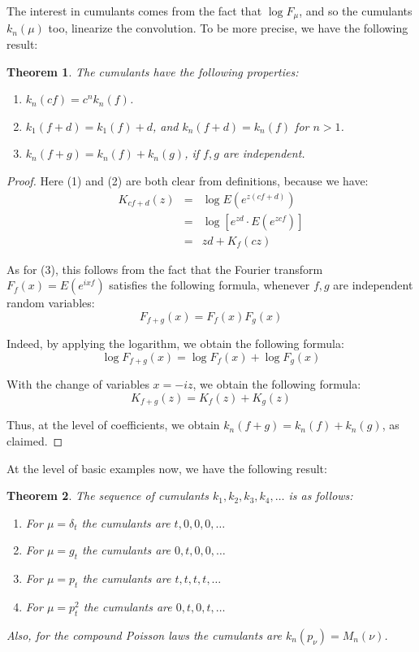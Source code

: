 \documentclass[12pt]{amsbook}
\newtheorem{theorem}{Theorem}[chapter]
\begin{document}
The interest in cumulants comes from the fact that $\log F_\mu$, and so the cumulants $k_n(\mu)$ too, linearize the convolution. To be more precise, we have the following result:


\begin{theorem}
The cumulants have the following properties:
\begin{enumerate}
\item $k_n(cf)=c^nk_n(f)$.

\item $k_1(f+d)=k_1(f)+d$, and $k_n(f+d)=k_n(f)$ for $n>1$.

\item $k_n(f+g)=k_n(f)+k_n(g)$, if $f,g$ are independent.
\end{enumerate}
\end{theorem}

\begin{proof}
Here (1) and (2) are both clear from definitions, because we have:
\begin{eqnarray*}
K_{cf+d}(z)
&=&\log E(e^{z(cf+d)})\\
&=&\log[e^{zd}\cdot E(e^{zcf})]\\
&=&zd+K_f(cz)
\end{eqnarray*}

As for (3), this follows from the fact that the Fourier transform $F_f(x)=E(e^{ixf})$ satisfies the following formula, whenever $f,g$ are independent random variables:
$$F_{f+g}(x)=F_f(x)F_g(x)$$

Indeed, by applying the logarithm, we obtain the following formula:
$$\log F_{f+g}(x)=\log F_f(x)+\log F_g(x)$$

With the change of variables $x=-iz$, we obtain the following formula:
$$K_{f+g}(z)=K_f(z)+K_g(z)$$

Thus, at the level of coefficients, we obtain $k_n(f+g)=k_n(f)+k_n(g)$, as claimed.
\end{proof}

At the level of basic examples now, we have the following result:

\begin{theorem}
The sequence of cumulants $k_1,k_2,k_3,k_4,\ldots$ is as follows:
\begin{enumerate}
\item For $\mu=\delta_t$ the cumulants are $t,0,0,0,\ldots$

\item For $\mu=g_t$ the cumulants are $0,t,0,0,\ldots$

\item For $\mu=p_t$ the cumulants are $t,t,t,t,\ldots$

\item For $\mu=p_t^2$ the cumulants are $0,t,0,t,\ldots$
\end{enumerate}
Also, for the compound Poisson laws the cumulants are $k_n(p_\nu)=M_n(\nu)$.
\end{theorem}
\end{document}
